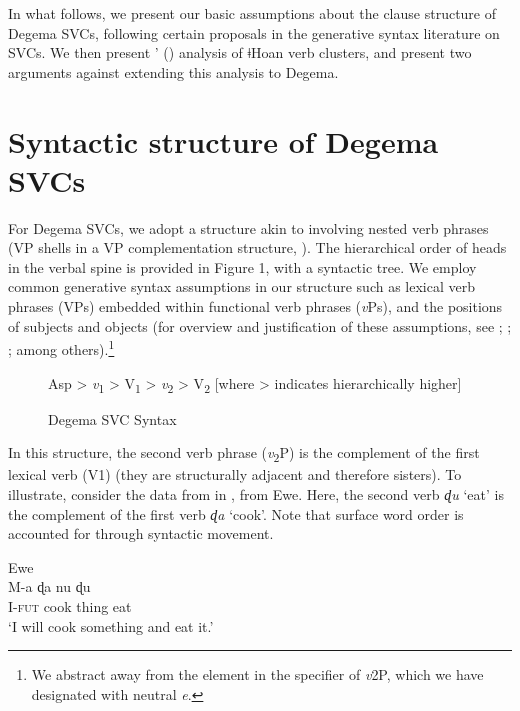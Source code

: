 \documentclass[output=paper]{langsci/langscibook}
\begin{document}
In what follows, we present our basic assumptions about the clause structure of Degema SVCs, following certain proposals in the generative syntax literature on SVCs. We then present \citeauthor{Collins2002}’ (\citeyear*{Collins2002}) analysis of ǂHoan verb clusters, and present two arguments against extending this analysis to Degema. 

\section{Syntactic structure of Degema SVCs}
For Degema SVCs, we adopt a structure akin to \citet{Collins1997,Collins2002} involving nested verb phrases (VP shells in a VP complementation structure, \citealt{ClearyKemp2015}). The hierarchical order of heads in the verbal spine is provided in Figure 1, with a syntactic tree. We employ common generative syntax assumptions in our structure such as lexical verb phrases (VPs) embedded within functional verb phrases (\textit{v}Ps), and the positions of subjects and objects (for overview and justification of these assumptions, see \citealt{Chomsky1995}; \citealt{Adger2003}; \citealt{Radford2004}; among others).\footnote{We abstract away from the element in the specifier of \textit{v}2P, which we have designated with neutral \textit{e}.
}

\begin{figure}

Asp > \textit{v}\textsubscript{1} > V\textsubscript{1} > \textit{v}\textsubscript{2} > V\textsubscript{2}
[where > indicates hierarchically higher]
\label{figure:1}

\caption{Degema SVC Syntax}
\end{figure}

In this structure, the second verb phrase (\textit{v}\textsubscript{2}P) is the complement of the first lexical verb (V1) (they are structurally adjacent and therefore sisters). To illustrate, consider the data from \citet{Collins1997} in , from Ewe. Here, the second verb \textit{ɖu} ‘eat’ is the complement of the first verb \textit{ɖa} ‘cook’. Note that surface word order is accounted for through syntactic movement.

\ea\label{ex:rolle:35} Ewe\\
\gll M-a  ɖa    nu    ɖu \\
     I-\textsc{fut}  cook  thing  eat \\
\glt ‘I will cook something and eat it.’ \citep[490-491]{Collins1997}
\z
\end{document}
